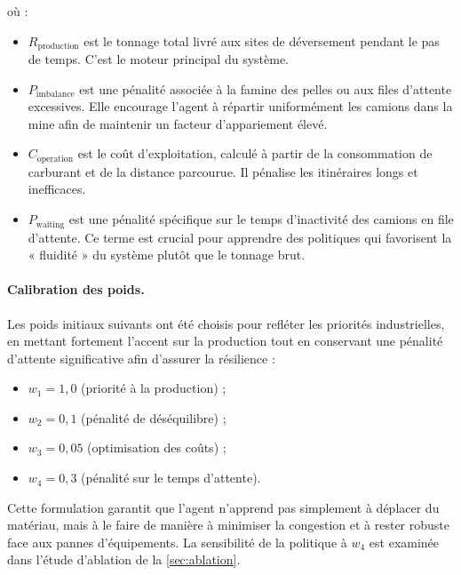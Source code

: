 \documentclass[11pt,a4paper]{article}
\begin{document}
où :

\begin{itemize}
  \item $R_{\mathrm{production}}$ est le tonnage total livré aux sites de déversement pendant le pas de temps. C'est le moteur principal du système.
  \item $P_{\mathrm{imbalance}}$ est une pénalité associée à la famine des pelles ou aux files d'attente excessives. Elle encourage l'agent à répartir uniformément les camions dans la mine afin de maintenir un facteur d'appariement élevé.
  \item $C_{\mathrm{operation}}$ est le coût d'exploitation, calculé à partir de la consommation de carburant et de la distance parcourue. Il pénalise les itinéraires longs et inefficaces.
  \item $P_{\mathrm{waiting}}$ est une pénalité spécifique sur le temps d'inactivité des camions en file d'attente. Ce terme est crucial pour apprendre des politiques qui favorisent la « fluidité » du système plutôt que le tonnage brut.
\end{itemize}

\paragraph{Calibration des poids.} Les poids initiaux suivants ont été choisis pour refléter les priorités industrielles, en mettant fortement l'accent sur la production tout en conservant une pénalité d'attente significative afin d'assurer la résilience :

\begin{itemize}
  \item $w_1 = 1{,}0$ (priorité à la production) ;
  \item $w_2 = 0{,}1$ (pénalité de déséquilibre) ;
  \item $w_3 = 0{,}05$ (optimisation des coûts) ;
  \item $w_4 = 0{,}3$ (pénalité sur le temps d'attente).
\end{itemize}

Cette formulation garantit que l'agent n'apprend pas simplement à déplacer du matériau, mais à le faire de manière à minimiser la congestion et à rester robuste face aux pannes d'équipements. La sensibilité de la politique à $w_4$ est examinée dans l'étude d'ablation de la \cref{sec:ablation}.

\end{document}
